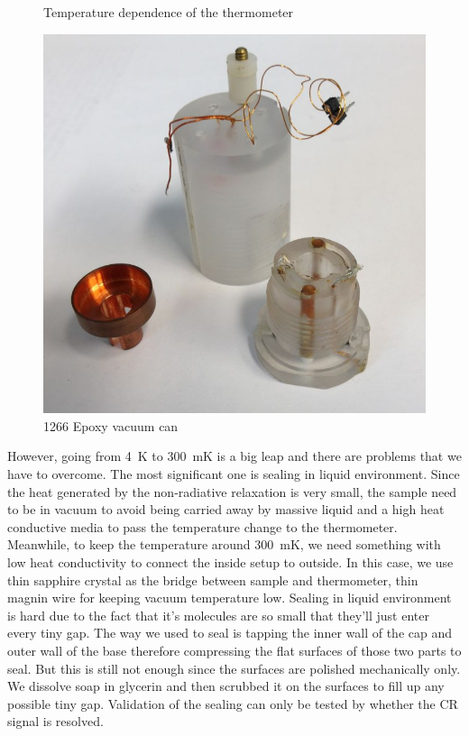 \documentclass[12pt]{ruthesis}
\begin{document}
\begin{figure}[!htb]
\begin {minipage}{0.3\textwidth}
     \caption{Temperature dependence of the thermometer}\label{r(t)}
   \end{minipage}
   \begin {minipage}{0.3\textwidth}
   	\includegraphics[scale=0.15]{figures/vacuumcan.JPG}
  	\caption{1266 Epoxy vacuum can}
   \end{minipage}
\end{figure}
 
 
However, going from \SI{4}{\kelvin} to \SI{300}{\milli\kelvin} is a big leap and there are problems that we have to overcome.
The most significant one is sealing in  liquid environment.
Since the heat generated by the non-radiative relaxation is very small, the sample need to be in vacuum to avoid being carried away by massive  liquid and a high heat conductive media to pass the temperature change to the thermometer.
Meanwhile, to keep the temperature around \SI{300}{\milli\kelvin}, we need something with low heat conductivity to connect the inside setup to outside.
In this case, we use thin sapphire crystal as the bridge between sample and thermometer, thin magnin wire for keeping vacuum temperature low.
Sealing in  liquid environment is hard due to the fact that it's molecules are so small that they'll just enter every tiny gap.
The way we used to seal is tapping the inner wall of the cap and outer wall of the base therefore compressing the flat surfaces of those two parts to seal.
But this is still not enough since the surfaces are polished mechanically only.
We dissolve soap in glycerin and then scrubbed it on the surfaces to fill up any possible tiny gap.
Validation of the sealing can only be tested by whether the CR signal is resolved.
\end{document}
